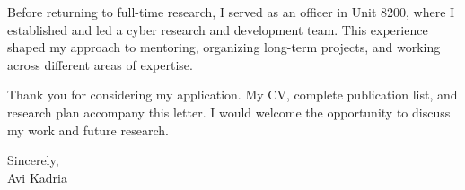 \documentclass[11pt,a4paper]{article}
\begin{document}
Before returning to full-time research, I served as an officer in Unit 8200, where I established and led a cyber research and development team. This experience shaped my approach to mentoring, organizing long-term projects, and working across different areas of expertise.

Thank you for considering my application. My CV, complete publication list, and research plan accompany this letter. I would welcome the opportunity to discuss my work and future research.

\vspace{0.4em}
Sincerely,\\[0.3em]
Avi Kadria
\end{document}
